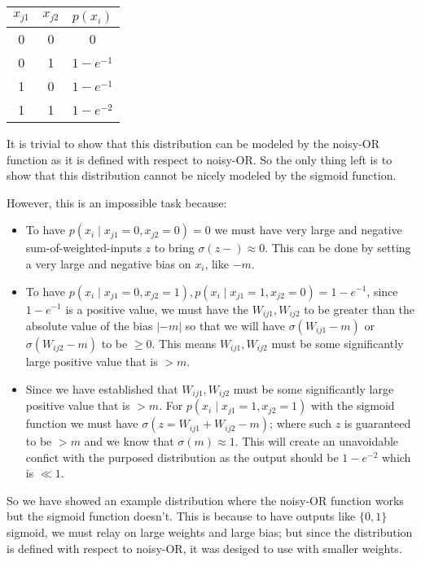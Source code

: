 \documentclass[11pt]{article}
\begin{document}
\begin{table}[H]
    \centering
    \begin{tabular}{ c  c | c }
        \hline
        $x_{j1}$ & $x_{j2}$ & $p(x_i)$ \\
        \hline
        0 & 0 & 0 \\
        0 & 1 & $1-e^{-1}$ \\
        1 & 0 & $1-e^{-1}$ \\
        1 & 1 & $1-e^{-2}$
    \end{tabular}
\end{table}

It is trivial to show that this distribution can be modeled by the noisy-OR function as it is defined with respect to noisy-OR. So the only thing left is to show that this distribution cannot be nicely modeled by the sigmoid function.

However, this is an impossible task because:

\begin{itemize}
    \item To have $p(x_i  \mid x_{j1} = 0, x_{j2} = 0) = 0$ we must have very large and negative sum-of-weighted-inputs $z$ to bring $\sigma(z - \text{}) \approx 0$. This can be done by setting a very large and negative bias on $x_i$, like $-m$.
    \item To have $p(x_i \mid x_{j1} = 0, x_{j2} = 1), p(x_i  \mid x_{j1} = 1, x_{j2} = 0) = 1-e^{-1}$, since $1-e^{-1}$ is a positive value, we must have the $W_{ij1}, W_{ij2}$ to be greater than the absolute value of the bias $|-m|$ so that we will have $\sigma(W_{ij1} - m)$ or $\sigma(W_{ij2} - m)$ to be $\geq 0$. This means $W_{ij1}, W_{ij2}$ must be some significantly large positive value that is $> m$.
    \item Since we have established that $W_{ij1}, W_{ij2}$ must be some significantly large positive value that is $> m$. For $p(x_i \mid x_{j1} = 1, x_{j2} = 1)$ with the sigmoid function we must have $\sigma(z = W_{ij1} + W_{ij2} - m)$; where such $z$ is guaranteed to be $>m$ and we know that $\sigma(m) \approx 1$. This will create an unavoidable confict with the purposed distribution as the output should be $1-e^{-2}$ which is $\ll 1$.
\end{itemize}

So we have showed an example distribution where the noisy-OR function works but the sigmoid function doesn't. This is because to have outputs like $\{0, 1\}$ sigmoid, we must relay on large weights and large bias; but since the distribution is defined with respect to noisy-OR, it was desiged to use with smaller weights.\newline
\end{document}
